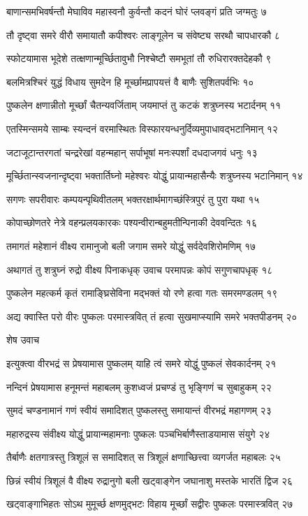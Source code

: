 बाणान्समभिवर्षन्तौ मेघाविव महास्वनौ
कुर्वन्तौ कदनं घोरं प्लवङ्गं प्रति जग्मतुः ७

तौ दृष्ट्वा समरे वीरौ समायातौ कपीश्वरः
लाङ्गूलेन च संवेष्ट्य सरथौ चापधारकौ ८

स्फोटयामास भूदेशे तत्क्षणान्मूर्च्छितावुभौ
निश्चेष्टौ समभूतां तौ रुधिरारक्तदेहकौ ९

बलमित्रश्चिरं युद्धं विधाय सुमदेन हि
मूर्च्छामप्रापयत्तं वै बाणैः सुशितपर्वभिः १०

पुष्कलेन क्षणान्नीतो मूर्च्छां चैतन्यवर्जिताम्
जयमाप्तं तु कटकं शत्रुघ्नस्य भटार्दनम् ११

एतस्मिन्समये साम्बः स्यन्दनं वरमास्थितः
विस्फारयन्धनुर्दिव्यमुपाधावद्भटानिमान् १२

जटाजूटान्तरगतां चन्द्ररेखां वहन्महान्
सर्पाभूषां मनःस्पर्शां दधदाजगवं धनुः १३

मूर्च्छितान्स्वजनान्दृष्ट्वा भक्तार्तिघ्नो महेश्वरः
योद्धुं प्रायान्महासैन्यैः शत्रुघ्नस्य भटानिमान् १४

सगणः सपरीवारः कम्पयन्पृथिवीतलम्
भक्तरक्षार्थमागच्छंस्त्रिपुरं तु पुरा यथा १५

कोपाच्छोणतरे नेत्रे वहन्प्रलयकारकः
पश्यन्वीरान्बहुमतीन्पिनाकी देववन्दितः १६

तमागतं महेशानं वीक्ष्य रामानुजो बली
जगाम समरे योद्धुं सर्वदेवशिरोमणिम् १७

अथागतं तु शत्रुघ्नं रुद्रो वीक्ष्य पिनाकधृक्
उवाच परमापन्नः कोपं सगुणचापधृक् १८

पुष्कलेन महत्कर्म कृतं रामाङ्घ्रिसेविना
मद्भक्तं यो रणे हत्वा गतः समरमण्डलम् १९

अद्य क्वास्ति परो वीरः पुष्कलः परमास्त्रवित्
तं हत्वा सुखमाप्स्यामि समरे भक्तपीडनम् २०

शेष उवाच

इत्युक्त्वा वीरभद्रं स प्रेषयामास पुष्कलम्
याहि त्वं समरे योद्धुं पुष्कलं सेवकार्दनम् २१

नन्दिनं प्रेषयामास हनूमन्तं महाबलम्
कुशध्वजं प्रचण्डं तु भृङ्गिणं च सुबाहुकम् २२

सुमदं चण्डनामानं गणं स्वीयं समादिशत्
पुष्कलस्तु समायान्तं वीरभद्रं महागणम् २३

महारुद्रस्य संवीक्ष्य योद्धुं प्रायान्महामनाः
पुष्कलः पञ्चभिर्बाणैस्ताडयामास संयुगे २४

तैर्बाणैः क्षतगात्रस्तु त्रिशूलं स समादिशत्
स त्रिशूलं क्षणाच्छित्त्वा व्यगर्जत महाबलः २५

छिन्नं स्वीयं त्रिशूलं वै वीक्ष्य रुद्रानुगो बली
खट्वाङ्गेन जघानाशु मस्तके भारतिं द्विज २६

खट्वाङ्गाभिहतः सोऽथ मुमूर्च्छ क्षणमुद्भटः
विहाय मूर्च्छां सद्वीरः पुष्कलः परमास्त्रवित् २७

